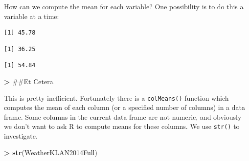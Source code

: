 \documentclass[]{krantz}
\makeatletter
\newenvironment{Shaded}{\begin{snugshade}}{\end{snugshade}}
\newcommand{\KeywordTok}[1]{\textcolor[rgb]{0.27,0.27,0.27}{\textbf{#1}}}
\newcommand{\StringTok}[1]{\textcolor[rgb]{0.5,0.5,0.5}{#1}}
\newcommand{\OperatorTok}[1]{\textcolor[rgb]{0.43,0.43,0.43}{\textbf{#1}}}
\newcommand{\NormalTok}[1]{#1}
\newenvironment{kframe}{%
\medskip{}
\setlength{\fboxsep}{.8em}
 \def\at@end@of@kframe{}%
 \ifinner\ifhmode%
  \def\at@end@of@kframe{\end{minipage}}%
  \begin{minipage}{\columnwidth}%
 \fi\fi%
 \def\FrameCommand##1{\hskip\@totalleftmargin \hskip-\fboxsep
 \colorbox{shadecolor}{##1}\hskip-\fboxsep
     \hskip-\linewidth \hskip-\@totalleftmargin \hskip\columnwidth}%
 \MakeFramed {\advance\hsize-\width
   \@totalleftmargin\z@ \linewidth\hsize
   \@setminipage}}%
 {\par\unskip\endMakeFramed%
 \at@end@of@kframe}
\renewenvironment{Shaded}{\begin{kframe}}{\end{kframe}}
\makeatother
\begin{document}
How can we compute the mean for each variable? One possibility is to do
this a variable at a time:

\begin{Shaded}
\end{Shaded}

\begin{verbatim}
[1] 45.78
\end{verbatim}

\begin{Shaded}
\end{Shaded}

\begin{verbatim}
[1] 36.25
\end{verbatim}

\begin{Shaded}
\end{Shaded}

\begin{verbatim}
[1] 54.84
\end{verbatim}

\begin{Shaded}
\begin{Highlighting}[]
\OperatorTok{>}\StringTok{ }\NormalTok{##Et Cetera}
\end{Highlighting}
\end{Shaded}

This is pretty inefficient. Fortunately there is a \texttt{colMeans()}
function which computes the mean of each column (or a specified number
of columns) in a data frame. Some columns in the current data frame are
not numeric, and obviously we don't want to ask R to compute means for
these columns. We use \texttt{str()} to investigate.

\begin{Shaded}
\begin{Highlighting}[]
\OperatorTok{>}\StringTok{ }\KeywordTok{str}\NormalTok{(WeatherKLAN2014Full)}
\end{Highlighting}
\end{Shaded}
\end{document}
